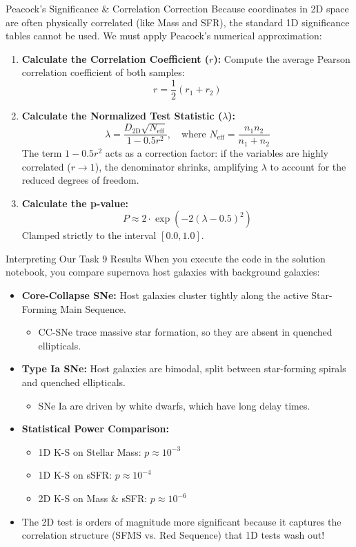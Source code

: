\documentclass[9pt]{beamer}
\begin{document}
\begin{frame}{Peacock's Significance \& Correlation Correction}
  Because coordinates in 2D space are often physically correlated (like Mass and SFR), the standard 1D significance tables cannot be used. We must apply Peacock's numerical approximation:
  \begin{enumerate}
    \item \textbf{Calculate the Correlation Coefficient ($r$):} Compute the average Pearson correlation coefficient of both samples:
      $$r = \frac{1}{2}(r_1 + r_2)$$
    \item \textbf{Calculate the Normalized Test Statistic ($\lambda$):}
      $$\lambda = \frac{D_{2\text{D}} \sqrt{N_{\text{eff}}}}{1 - 0.5 r^2}, \quad \text{where } N_{\text{eff}} = \frac{n_1 n_2}{n_1 + n_2}$$
      The term $1 - 0.5r^2$ acts as a correction factor: if the variables are highly correlated ($r \to 1$), the denominator shrinks, amplifying $\lambda$ to account for the reduced degrees of freedom.
    \item \textbf{Calculate the p-value:}
      $$P \approx 2 \cdot \exp\left(-2(\lambda - 0.5)^2\right)$$
      Clamped strictly to the interval $[0.0, 1.0]$.
  \end{enumerate}
\end{frame}

\begin{frame}{Interpreting Our Task 9 Results}
  When you execute the code in the solution notebook, you compare supernova host galaxies with background galaxies:
  \begin{itemize}
    \item \textbf{Core-Collapse SNe:} Host galaxies cluster tightly along the active Star-Forming Main Sequence.
      \begin{itemize}
        \item CC-SNe trace massive star formation, so they are absent in quenched ellipticals.
      \end{itemize}
    \item \textbf{Type Ia SNe:} Host galaxies are bimodal, split between star-forming spirals and quenched ellipticals.
      \begin{itemize}
        \item SNe Ia are driven by white dwarfs, which have long delay times.
      \end{itemize}
    \item \textbf{Statistical Power Comparison:}
      \begin{itemize}
        \item 1D K-S on Stellar Mass: $p \approx 10^{-3}$
        \item 1D K-S on sSFR: $p \approx 10^{-4}$
        \item \alert{2D K-S on Mass \& sSFR:} $p \approx 10^{-6}$
      \end{itemize}
    \item The 2D test is orders of magnitude more significant because it captures the correlation structure (SFMS vs. Red Sequence) that 1D tests wash out!
  \end{itemize}
\end{frame}
\end{document}

